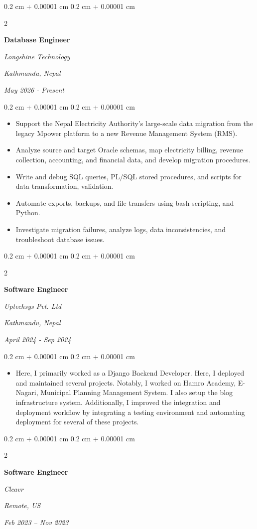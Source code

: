 \documentclass[10pt, letterpaper]{article}
\newenvironment{highlights}{
    \begin{itemize}[
        topsep=0.10 cm,
        parsep=0.10 cm,
        partopsep=0pt,
        itemsep=0pt,
        leftmargin=0.4 cm + 10pt
    ]
}{
    \end{itemize}
} %
\newenvironment{onecolentry}{
    \begin{adjustwidth}{
        0.2 cm + 0.00001 cm
    }{
        0.2 cm + 0.00001 cm
    }
}{
    \end{adjustwidth}
} %
\newenvironment{twocolentry}[2][]{
    \onecolentry
    \def\secondColumn{#2}
    \setcolumnwidth{\fill, 4.5 cm}
    \begin{paracol}{2}
}{
    \switchcolumn \raggedleft \secondColumn
    \end{paracol}
    \endonecolentry
} %
\begin{document}
        \begin{twocolentry}{
            \textit{Kathmandu, Nepal}

            \textit{May 2026 - Present}
        }
            \textbf{Database Engineer}

            \textit{Longshine Technology}
        \end{twocolentry}
        \vspace{0.1 cm}
        \begin{onecolentry}
            \begin{highlights}
                \item Support the Nepal Electricity Authority's large-scale data migration from the legacy Mpower platform to a new Revenue Management System (RMS).
                \item Analyze source and target Oracle schemas, map electricity billing, revenue collection, accounting, and financial data, and develop migration procedures.
                \item Write and debug SQL queries, PL/SQL stored procedures, and scripts for data transformation, validation.
                \item Automate exports, backups, and file transfers using bash scripting, and Python.
                \item Investigate migration failures, analyze logs, data inconsistencies, and troubleshoot database issues.
            \end{highlights}
        \end{onecolentry}
        \vspace{0.2 cm}

        \begin{twocolentry}{
            \textit{Kathmandu, Nepal}    

            \textit{April 2024 - Sep 2024}
        }
            \textbf{Software Engineer}

            \textit{Uptechsys Pvt. Ltd}
        \end{twocolentry}
        \vspace{0.1 cm}
        \begin{onecolentry}
            \begin{highlights}
            \item Here, I primarily worked as a Django Backend Developer. Here, I deployed and maintained several projects. Notably, I worked on Hamro Academy, E-Nagari, Municipal Planning Management System. I also setup the blog infrastructure system. Additionally, I improved the integration and deployment workflow by integrating a testing environment and automating deployment for several of these projects. 
        \end{highlights}
        \end{onecolentry}
        \vspace{0.1 cm}
        \begin{twocolentry}{
        \textit{Remote, US}    
            
        \textit{Feb 2023 – Nov 2023}}
            \textbf{Software Engineer}
            
            \textit{Cleavr}
        \end{twocolentry}
\end{document}
